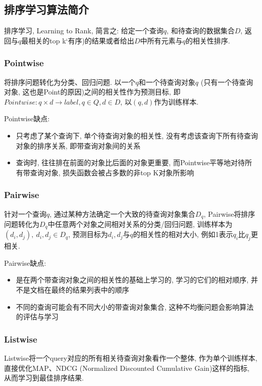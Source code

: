 \subsection{排序学习算法简介}
排序学习, Learning to Rank, 简言之: 给定一个查询$q$, 和待查询的数据集合$D$, 返回与$q$最相关的top k`有序)的结果或者给出$D$中所有元素与$q$的相关性排序. 

\subsubsection{Pointwise}
将排序问题转化为分类、回归问题. 以一个$q$和一个待查询对象$q$ (只有一个待查询对象, 这也是Point的原因)之间的相关性作为预测目标, 即$Pointwise: q \times d \rightarrow label, q \in Q, d \in D$, 以$ (q, d)$作为训练样本. 

Pointwise缺点: 
\begin{itemize}
	\item 只考虑了某个查询下, 单个待查询对象的相关性, 没有考虑该查询下所有待查询对象的排序关系, 即带查询对象间的关系
	\item 查询时, 往往排在前面的对象比后面的对象更重要, 而Pointwise平等地对待所有带查询对象, 损失函数会被占多数的非top K对象所影响
\end{itemize}


\subsubsection{Pairwise}
针对一个查询$q$, 通过某种方法确定一个大致的待查询对象集合$D_q$, Pairwise将排序问题转化为$D_q$中任意两个对象之间相对关系的分类/回归问题, 训练样本为$ (d_i, d_j),\: d_i, d_j \in D_q$, 预测目标为$d_i, d_j$与$q$的相关性的相对大小, 例如1表示$q_i$比$q_j$更相关. 

Pairwise缺点: 
\begin{itemize}
	\item 是在两个带查询对象之间的相关性的基础上学习的, 学习的它们的相对顺序, 并不是文档在最终的结果列表中的顺序
	\item 不同的查询可能会有不同大小的带查询对象集合, 这种不均衡问题会影响算法的评估与学习
\end{itemize}


\subsubsection{Listwise}
Listwise将一个query对应的所有相关待查询对象看作一个整体, 作为单个训练样本, 直接优化MAP、NDCG (Normalized Discounted Cumulative Gain)这样的指标, 从而学习到最佳排序结果. 



